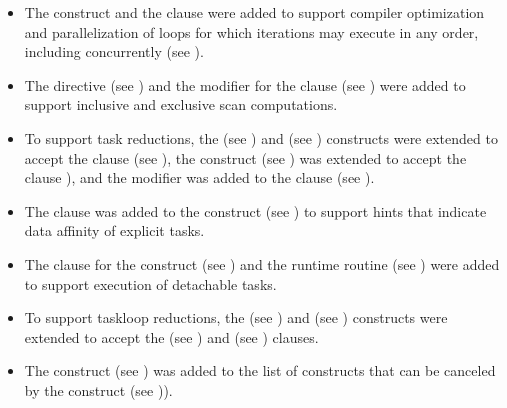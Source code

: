 \begin{itemize}
\item The  construct and the  clause were added to support compiler
      optimization and parallelization of loops for which iterations may
      execute in any order, including concurrently (see ).

\item The  directive (see ) and the
       modifier for the  clause (see
      ) were added to support
      inclusive and exclusive scan computations.

\item To support task reductions, the  (see
      ) and  (see
      ) constructs were extended to
      accept the  clause (see
      ), the 
      construct (see ) was extended
      to accept the  clause
      ), and the 
      modifier was added to the  clause (see
      ).

\item The  clause was added to the  construct
      (see ) to support hints that indicate 
      data affinity of explicit tasks.

\item The  clause for the  construct (see 
      ) and the 
      runtime routine (see ) were added 
      to support execution of detachable tasks.

\item To support taskloop reductions, the  (see
      ) and  (see
      ) constructs were extended
      to accept the  (see )
      and  (see )
      clauses.

\item The  construct (see )
      was added to the list of constructs that can be canceled by the
       construct (see )).


\end{itemize}
